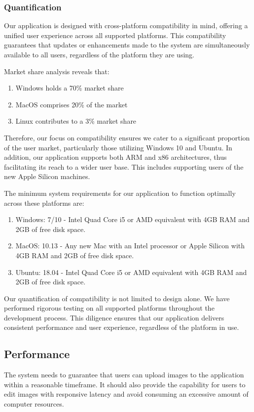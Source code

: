 \documentclass[11pt,a4paper]{article}
\begin{document}
\subsubsection*{Quantification}

Our application is designed with cross-platform compatibility in mind, offering
a unified user experience across all supported platforms. This compatibility
guarantees that updates or enhancements made to the system are simultaneously
available to all users, regardless of the platform they are using.

Market share analysis reveals that:

\begin{enumerate}
  \item Windows holds a 70\% market share
  \item MacOS comprises 20\% of the market
  \item Linux contributes to a 3\% market share
\end{enumerate}

Therefore, our focus on compatibility ensures we cater to a significant
proportion of the user market, particularly those utilizing Windows 10 and
Ubuntu. In addition, our application supports both ARM and x86 architectures,
thus facilitating its reach to a wider user base. This includes supporting users
of the new Apple Silicon machines.

The minimum system requirements for our application to function optimally across
these platforms are:

\begin{enumerate}
  \item Windows: 7/10 - Intel Quad Core i5 or AMD equivalent with 4GB RAM and
  2GB of free disk space.
  \item MacOS: 10.13 - Any new Mac with an Intel processor or Apple Silicon with
  4GB RAM and 2GB of free disk space.
  \item Ubuntu: 18.04 - Intel Quad Core i5 or AMD equivalent with 4GB RAM and
  2GB of free disk space.
\end{enumerate}

Our quantification of compatibility is not limited to design alone. We have
performed rigorous testing on all supported platforms throughout the development
process. This diligence ensures that our application delivers consistent
performance and user experience, regardless of the platform in use.

\subsection*{Performance}
The system needs to guarantee that users can upload images to the application within a reasonable timeframe. It should also provide the capability for users to edit images with responsive latency and avoid consuming an excessive amount of computer resources. 
\end{document}
